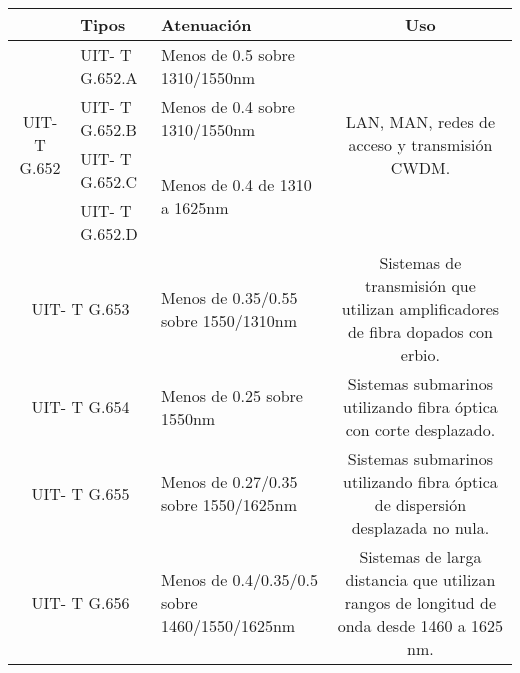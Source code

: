 


 




\begin{table}[H]
  \tiny
  \centering
    \begin{tabular}{|c|p{6.78em}|p{22.945em}|c|}
    \hline
    \rowcolor[HTML]{C5D9F1} \multicolumn{1}{|p{9.055em}|}{\textbf{Recomendación}} & \textbf{Tipos} & \textbf{Atenuación} & \multicolumn{1}{p{41.335em}|}{\textbf{Uso}} \bigstrut\\
    \hline
    \multicolumn{1}{|c|}{\multirow{4}[8]{*}{UIT- T G.652}} & UIT- T G.652.A & Menos de 0.5 sobre 1310/1550nm & \multicolumn{1}{c|}{\multirow{4}[8]{*}{LAN, MAN, redes de acceso y transmisión CWDM.}} \bigstrut\\
\cline{2-3}          & UIT- T G.652.B & Menos de 0.4 sobre 1310/1550nm &  \bigstrut\\
\cline{2-3}          & UIT- T G.652.C & \multirow{2}[4]{*}{Menos de 0.4 de 1310 a 1625nm} &  \bigstrut\\
\cline{2-2}          & UIT- T G.652.D & \multicolumn{1}{c|}{} &  \bigstrut\\
    \hline
    \multicolumn{2}{|p{17.835em}|}{UIT- T G.653} & Menos de 0.35/0.55 sobre 1550/1310nm & \multicolumn{1}{p{41.335em}|}{Sistemas de transmisión que utilizan amplificadores de fibra dopados con erbio.} \bigstrut\\
    \hline
    \multicolumn{2}{|p{17.835em}|}{UIT- T G.654} & Menos de 0.25 sobre 1550nm & \multicolumn{1}{p{41.335em}|}{Sistemas submarinos utilizando fibra óptica con corte desplazado.} \bigstrut\\
    \hline
    \multicolumn{2}{|p{17.835em}|}{UIT- T G.655} & Menos de 0.27/0.35 sobre 1550/1625nm & \multicolumn{1}{p{41.335em}|}{Sistemas submarinos utilizando fibra óptica de dispersión desplazada no nula.} \bigstrut\\
    \hline
    \multicolumn{2}{|p{17.835em}|}{UIT- T G.656} & Menos de 0.4/0.35/0.5 sobre 1460/1550/1625nm & \multicolumn{1}{p{41.335em}|}{Sistemas de larga distancia que utilizan rangos de longitud de onda desde 1460 a 1625 nm.\newline{}} \bigstrut\\

\end{tabular}
\end{table}
